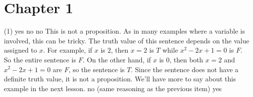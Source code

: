     \section*{Chapter 1}
\begin{Solution}{1.1}
\quad
    \begin{tasks}(1)
      \task yes
      \task no
      \task no
      \task This is not a proposition. As in many examples where a variable is involved,
this can be tricky. The truth value of this sentence depends on the value assigned to $x$. For example,
if $x$ is $2$, then $x=2$ is $T$ while $x^2-2x+1=0$ is $F$. So the entire sentence is $F$. On the
other hand, if $x$ is $0$, then both $x=2$ and $x^2-2x+1=0$ are $F$, so the sentence is $T$.
Since the sentence does not have a definite truth value, it is not a proposition. We'll have more
to say about this example in the next lesson.
      \task no (same reasoning as the previous item)
      \task* yes
    \end{tasks}%
  
\end{Solution}
